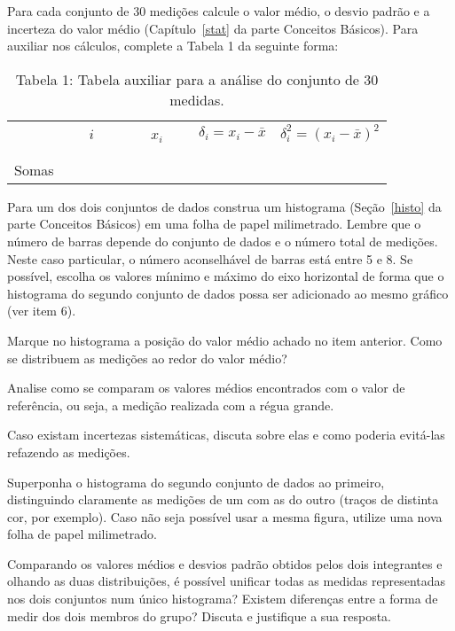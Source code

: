 \begin{num}
\item Para cada conjunto de 30 medições calcule o valor médio, o desvio padrão e a incerteza do valor médio (Capítulo~\ref{stat} da parte Conceitos Básicos). Para auxiliar nos cálculos, complete a Tabela 1 da seguinte forma:

\begin{table}[h]
\begin{center}

\hspace{-0.8cm}
  \begin{tabular}[m]{ l | c | c | c | c |}
    \cline{2-5}	
    &  ~~~$i$~~~ & ~~~$x_i$~~~ & $\delta_i = x_i - \bar{x}$ & $\delta_i^2 = (x_i - \bar{x})^2$ \\\cline{2-5}
   & & & & \\
    &  & & &  \\ \cline{2-5}
    Somas & & & & \\ \cline{2-5}
  \end{tabular}
  \caption*{Tabela 1: Tabela auxiliar para a análise do conjunto de 30 medidas.}
\end{center}
\vspace{0cm}
\end{table}

\item Para um dos dois conjuntos de dados construa um histograma (Seção~\ref{histo} da parte Conceitos Básicos) em uma folha de papel milimetrado. Lembre que o número de barras depende do conjunto de dados e o número total de medições. Neste caso particular, o número aconselhável de barras está entre 5 e 8. Se possível, escolha os valores míınimo e máximo do eixo horizontal de forma que o histograma do segundo conjunto de dados possa ser adicionado ao mesmo gráfico (ver item 6).

\item Marque no histograma a posição do valor médio achado no item anterior. Como se distribuem as medições ao redor do valor médio?

\item Analise como se comparam os valores médios encontrados com o valor de referência, ou seja, a medição realizada com a régua grande.

\item Caso existam incertezas sistemáticas, discuta sobre elas e como poderia evitá-las refazendo as medições.

\item Superponha o histograma do segundo conjunto de dados ao primeiro, distinguindo claramente as medições de um com as do outro (traços de distinta cor, por exemplo). Caso não seja possível usar a mesma figura, utilize uma nova folha de papel milimetrado.

\item Comparando os valores médios e desvios padrão obtidos pelos dois integrantes e olhando as duas distribuições, é possível unificar todas as medidas representadas nos dois conjuntos num único histograma? Existem diferenças entre a forma de medir dos dois membros do grupo? Discuta e justifique a sua resposta.

\end{num}



